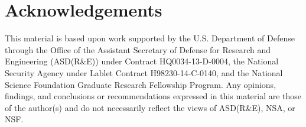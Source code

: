 \documentclass{sig-alternate-05-2015}
\begin{document}
\section{Acknowledgements}
This material is based upon work supported by the U.S. Department of Defense through the Office of the Assistant Secretary of Defense for Research and Engineering (ASD(R\&E)) under Contract HQ0034-13-D-0004, the National Security Agency under Lablet Contract H98230-14-C-0140, and the National Science Foundation Graduate Research Fellowship Program. Any opinions, findings, and conclusions or recommendations expressed in this material are those of the author(s) and do not necessarily reflect the views of  ASD(R\&E), NSA, or NSF.



\end{document}
